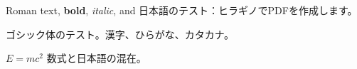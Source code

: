\documentclass{article}
\begin{document}
Roman text, \textbf{bold}, \textit{italic}, and 日本語のテスト：ヒラギノでPDFを作成します。

{\sffamily ゴシック体のテスト。漢字、ひらがな、カタカナ。}

$E=mc^2$ 数式と日本語の混在。
\end{document}
